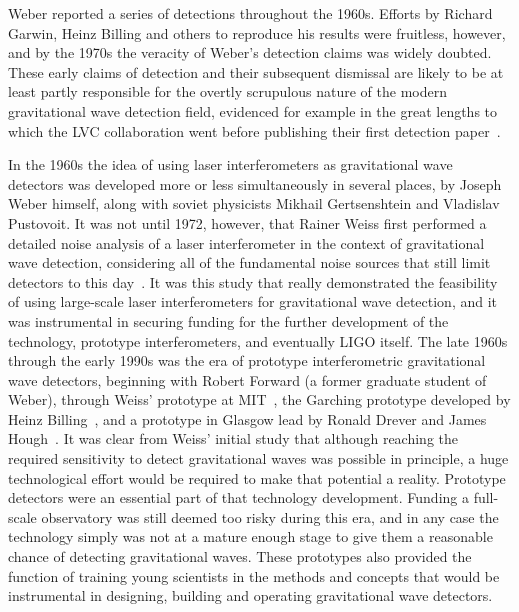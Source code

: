 Weber reported a series of detections throughout the 1960s. Efforts by Richard Garwin, Heinz Billing and others 
to reproduce his results were fruitless, however, and by the 1970s the veracity of Weber's detection claims was widely doubted. 
These early claims of detection and their subsequent dismissal are likely to be at least partly responsible for the 
overtly scrupulous nature of the modern gravitational wave detection field, evidenced for example in the great lengths to which 
the LVC collaboration went before publishing their first detection paper~\cite{GW150914}.

In the 1960s the idea of using laser interferometers as gravitational wave detectors was developed more or less simultaneously 
in several places, by Joseph Weber himself, along with soviet physicists Mikhail Gertsenshtein and Vladislav Pustovoit. 
It was not until 1972, however, that Rainer Weiss first performed a detailed noise analysis of a laser interferometer in the context 
of gravitational wave detection, considering all of the fundamental noise sources that still limit detectors to this day~\cite{Weiss1972}. 
It was this study that really demonstrated the feasibility of using large-scale laser interferometers for gravitational wave detection, and 
it was instrumental in securing funding for the further development of the technology, prototype interferometers, and eventually LIGO itself. 
The late 1960s through the early 1990s was the era of prototype interferometric gravitational wave detectors, beginning with 
Robert Forward (a former graduate student of Weber), through Weiss' prototype at MIT~\cite{MITprototype}, the Garching prototype developed by 
Heinz Billing~\cite{Shoemaker1988}, and a prototype in Glasgow lead by Ronald Drever and James Hough~\cite{JIF}. 
It was clear from Weiss' initial study that although reaching the required sensitivity to detect gravitational waves 
was possible in principle, a huge technological effort would 
be required to make that potential a reality. 
Prototype detectors were an essential part of that technology development. Funding a full-scale 
observatory was still deemed too risky during this era, and in any case the technology simply was not at a mature enough stage to give them 
a reasonable chance of detecting gravitational waves. These prototypes also provided the function 
of training young scientists in the methods and concepts that would be instrumental in 
designing, building and operating gravitational wave detectors. 

